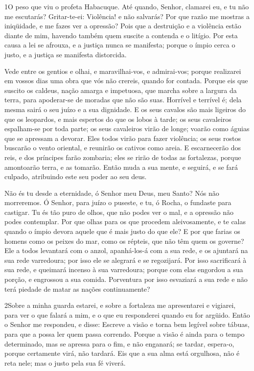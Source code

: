 
\lettrine{1} O peso que viu o profeta Habacuque. Até
quando, Senhor, clamarei eu, e tu não me escutarás? Gritar-te-ei:
Violência! e não salvarás? Por que razão me mostras a
iniqüidade, e me fazes ver a opressão? Pois que a destruição e a
violência estão diante de mim, havendo também quem suscite a
contenda e o litígio. Por esta causa a lei se afrouxa, e a
justiça nunca se manifesta; porque o ímpio cerca o justo, e a
justiça se manifesta distorcida.

Vede entre os gentios e olhai, e maravilhai-vos, e admirai-vos;
porque realizarei em vossos dias uma obra que vós não crereis,
quando for contada. Porque eis que suscito os caldeus, nação
amarga e impetuosa, que marcha sobre a largura da terra, para
apoderar-se de moradas que não são suas. Horrível e terrível é;
dela mesma sairá o seu juízo e a sua dignidade. E os seus
cavalos são mais ligeiros do que os leopardos, e mais espertos do
que os lobos à tarde; os seus cavaleiros espalham-se por toda parte;
os seus cavaleiros virão de longe; voarão como águias que se
apressam a devorar. Eles todos virão para fazer violência; os
seus rostos buscarão o vento oriental, e reunirão os cativos como
areia. E escarnecerão dos reis, e dos príncipes farão
zombaria; eles se rirão de todas as fortalezas, porque amontoarão
terra, e as tomarão. Então muda a sua mente, e seguirá, e se
fará culpado, atribuindo este seu poder ao seu deus.

Não és tu desde a eternidade, ó Senhor meu Deus, meu Santo? Nós
não morreremos. Ó Senhor, para juízo o puseste, e tu, ó Rocha, o
fundaste para castigar. Tu és tão puro de olhos, que não
podes ver o mal, e a opressão não podes contemplar. Por que olhas
para os que procedem aleivosamente, e te calas quando o ímpio devora
aquele que é mais justo do que ele? E por que farias os
homens como os peixes do mar, como os répteis, que não têm quem os
governe? Ele a todos levantará com o anzol, apanhá-los-á com
a sua rede, e os ajuntará na sua rede varredoura; por isso ele se
alegrará e se regozijará. Por isso sacrificará à sua rede, e
queimará incenso à sua varredoura; porque com elas engordou a sua
porção, e engrossou a sua comida. Porventura por isso
esvaziará a sua rede e não terá piedade de matar as nações
continuamente?

\medskip

\lettrine{2} Sobre a minha guarda estarei, e sobre a fortaleza
me apresentarei e vigiarei, para ver o que falará a mim, e o que eu
responderei quando eu for argüido. Então o Senhor me respondeu,
e disse: Escreve a visão e torna bem legível sobre tábuas, para que
a possa ler quem passa correndo. Porque a visão é ainda para o
tempo determinado, mas se apressa para o fim, e não enganará; se
tardar, espera-o, porque certamente virá, não tardará. Eis que a
sua alma está orgulhosa, não é reta nele; mas o justo pela sua fé
viverá.

